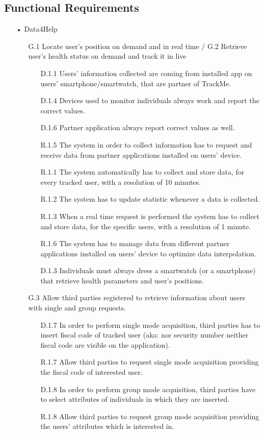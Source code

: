 \subsection{Functional Requirements}
\begin{enumerate}
\item[•]{\Large Data4Help}
	\begin{enumerate}
	\item [G.1] Locate user's position on demand and in real time / G.2 Retrieve user's health status on demand and track it in live
		\begin{enumerate}
		\item [D.1.1] Users' information collected are coming from installed app on users' smartphone/smartwatch, that are partner of TrackMe.
		\item [D.1.4] Devices used to monitor individuals always work and report 			the correct values.	
		\item [D.1.6] Partner application always report correct values as well.
		\item [R.1.5] The system in order to collect information has to request and receive data from partner applications installed on users' device.
		\item [R.1.1] The system automatically has to collect and store data, for every tracked user, with a resolution of 10 minutes.
    	\item [R.1.2] The system has to update statistic whenever a data is collected.
    	\item [R.1.3] When a real time request is performed the system has to collect and store data, for the specific users, with a resolution of 1 minute.
    	\item [R.1.6] The system has to manage data from different partner applications installed on users' device to optimize data interpolation.
		\item [D.1.3] Individuals must always dress a smartwatch (or a smartphone) that retrieve health parameters and user's positions.    	
		\end{enumerate}		
		
	\item [G.3] Allow third parties registered to retrieve information about users with single and group requests.
		\begin{enumerate}
		\item [D.1.7] In order to perform single mode acquisition, third parties has to insert fiscal code of tracked user (aka: nor security number neither fiscal code are visible on the application).
		\item [R.1.7] Allow third parties to request single mode acquisition providing the fiscal code of interested user.	
		\item [D.1.8] In order to perform group mode acquisition, third parties have to select attributes of individuals in which they are inserted.
		\item [R.1.8] Allow third parties to request group mode acquisition providing the users' attributes which is interested in.		
		

\end{enumerate}
\end{enumerate}
\end{enumerate}
